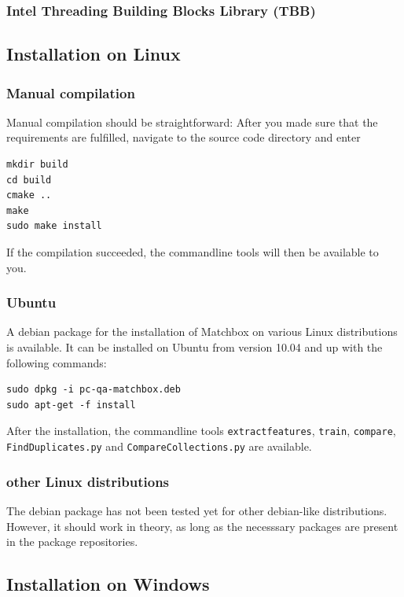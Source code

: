 \subsubsection{Intel Threading Building Blocks Library (TBB)}

\subsection{Installation on Linux}

\subsubsection{Manual compilation}
Manual compilation should be straightforward:
After you made sure that the requirements are fulfilled,
navigate to the source code directory and enter

\begin{verbatim}
mkdir build
cd build
cmake ..
make
sudo make install
\end{verbatim}

If the compilation succeeded, the commandline tools will then be available to you.

\subsubsection{Ubuntu}
A debian package for the installation of Matchbox on various Linux distributions is available.
It can be installed on Ubuntu from version 10.04 and up with the following commands:

\begin{verbatim}
sudo dpkg -i pc-qa-matchbox.deb
sudo apt-get -f install
\end{verbatim}

After the installation, the commandline tools \verb+extractfeatures+, \verb+train+,
\verb+compare+, \verb+FindDuplicates.py+ and \verb+CompareCollections.py+ are 
available.

\subsubsection{other Linux distributions}
The debian package has not been tested yet for other debian-like distributions.
However, it should work in theory, as long as the necesssary packages are present
in the package repositories.

\subsection{Installation on Windows}

